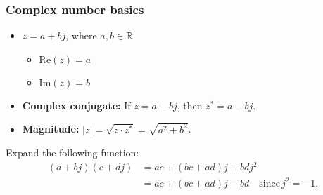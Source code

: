     \subsubsection{Complex number basics}
    \begin{definition}
    \begin{itemize}
        \item \( z = a + bj \), where \( a, b \in \mathbb{R} \)
        \begin{itemize}
            \item \( \text{Re}(z) = a \)
            \item \( \text{Im}(z) = b \)
        \end{itemize}
        
        \item \textbf{Complex conjugate:} If \( z = a + bj \), then \( z^* = a - bj \).
        
        \item \textbf{Magnitude:} \( |z| = \sqrt{z \cdot z^*} = \sqrt{a^2 + b^2} \).
    \end{itemize}

        \begin{center}
        \end{center}

    \end{definition}

    \begin{example} 
        Expand the following function:
        \begin{align*}
            (a + bj)(c + dj) &= ac + (bc + ad)j + bdj^2 \\
            &= ac + (bc + ad)j - bd \quad \text{since} \, j^2 = -1.
        \end{align*}
    \end{example}

